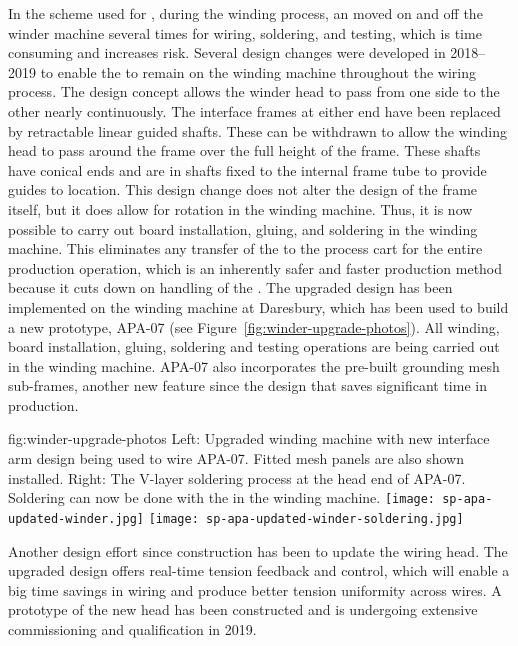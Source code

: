 In the scheme used for , during the winding process, an  moved on and off the winder machine several times for wiring, soldering, and testing, which is time consuming and increases risk.  Several design changes were developed in 2018--2019 to enable the  to remain on the winding machine throughout the wiring process. The design concept allows the winder head to pass from one side to the other nearly continuously. The interface frames at either end have been replaced by retractable linear guided shafts. These can be withdrawn to allow the winding head to pass around the frame over the full height of the frame. These shafts have conical ends and are in shafts fixed to the internal frame tube to provide guides to location. This design change does not alter the design of the frame itself, but it does allow for rotation in the winding machine. Thus, it is now possible to carry out board installation, gluing, and soldering in the winding machine. This eliminates any transfer of the  to the process cart for the entire production operation, which is an inherently safer and faster production method because it cuts down on handling of the .  The upgraded design has been implemented on the winding machine at Daresbury, which has been used to build a new prototype, APA-07 (see Figure~\ref{fig:winder-upgrade-photos}). All winding, board installation, gluing, soldering and testing operations are being carried out in the winding machine. APA-07 also incorporates the pre-built grounding mesh sub-frames, another new feature since the  design that saves significant time in production.  

\begin{dunefigure}{fig:winder-upgrade-photos}
{Left: Upgraded winding machine with new interface arm design being used to wire APA-07. Fitted mesh panels are also shown installed. Right: The V-layer soldering process at the head end of APA-07. Soldering can now be done with the  in the winding machine.}
\texttt{[image: sp-apa-updated-winder.jpg]} 
\texttt{[image: sp-apa-updated-winder-soldering.jpg]}
\end{dunefigure}

Another design effort since  construction has been to update the wiring head. The upgraded design offers real-time tension feedback and control, which will enable a big time savings in wiring and produce better tension uniformity across wires.  A prototype of the new head has been constructed and is undergoing extensive commissioning and qualification in 2019.   %

